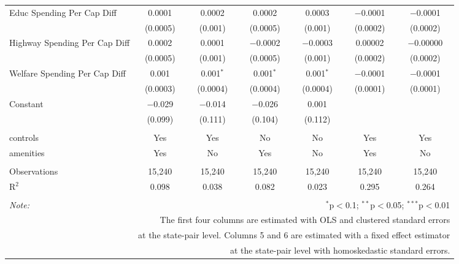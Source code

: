 \begin{table}[!htbp]
\begin{tabular}{@{\extracolsep{5pt}}lcccccc}
  Educ Spending Per Cap Diff & 0.0001 & 0.0002 & 0.0002 & 0.0003 & $-$0.0001 & $-$0.0001 \\ 
  & (0.0005) & (0.001) & (0.0005) & (0.001) & (0.0002) & (0.0002) \\ 
  Highway Spending Per Cap Diff & 0.0002 & 0.0001 & $-$0.0002 & $-$0.0003 & 0.00002 & $-$0.00000 \\ 
  & (0.0005) & (0.001) & (0.0005) & (0.001) & (0.0002) & (0.0002) \\ 
  Welfare Spending Per Cap Diff & 0.001 & 0.001$^{*}$ & 0.001$^{*}$ & 0.001$^{*}$ & $-$0.0001 & $-$0.0001 \\ 
  & (0.0003) & (0.0004) & (0.0004) & (0.0004) & (0.0001) & (0.0001) \\ 
  Constant & $-$0.029 & $-$0.014 & $-$0.026 & 0.001 &  &  \\ 
  & (0.099) & (0.111) & (0.104) & (0.112) &  &  \\ 
 \hline \\[-1.8ex] 
controls & Yes & Yes & No & No & Yes & Yes \\ 
amenities & Yes & No & Yes & No & Yes & No \\ 
\hline \\[-1.8ex] 
Observations & 15,240 & 15,240 & 15,240 & 15,240 & 15,240 & 15,240 \\ 
R$^{2}$ & 0.098 & 0.038 & 0.082 & 0.023 & 0.295 & 0.264 \\ 
\hline 
\hline \\[-1.8ex] 
\textit{Note:}  & \multicolumn{6}{r}{$^{*}$p$<$0.1; $^{**}$p$<$0.05; $^{***}$p$<$0.01} \\ 
 & \multicolumn{6}{r}{The first four columns are estimated with OLS and clustered standard errors} \\ 
 & \multicolumn{6}{r}{at the state-pair level. Columns 5 and 6 are estimated with a fixed effect estimator} \\ 
 & \multicolumn{6}{r}{at the state-pair level with homoskedastic standard errors.} \\ 
\end{tabular} 
\end{table} 
